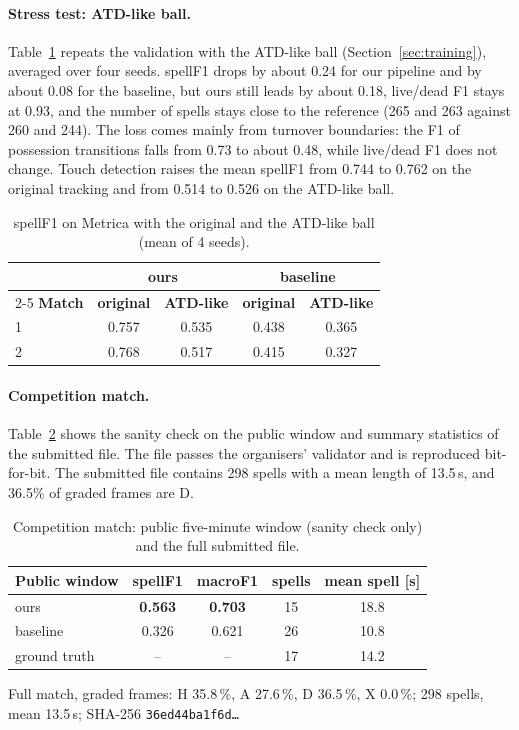 \documentclass[11pt,a4paper]{article}
\newcommand{\code}[1]{\texttt{#1}}
\begin{document}
\paragraph{Stress test: ATD-like ball.}
Table~\ref{tab:stress} repeats the validation with the ATD-like ball (Section~\ref{sec:training}), averaged over four
seeds. spellF1 drops by about 0.24 for our pipeline and by about 0.08 for the baseline, but ours still leads by about
0.18, live/dead F1 stays at 0.93, and the number of spells stays close to the reference (265 and 263 against 260 and
244). The loss comes mainly from turnover boundaries: the F1 of possession transitions falls from 0.73 to about
0.48, while live/dead F1 does not change. Touch detection raises the mean spellF1 from 0.744 to 0.762 on the original tracking and
from 0.514 to 0.526 on the ATD-like ball.

\begin{table}[ht]
\centering
\small
\caption{spellF1 on Metrica with the original and the ATD-like ball (mean of 4 seeds).}
\label{tab:stress}
{\renewcommand{\arraystretch}{1.25}
\begin{tabular}{|l|c|c|c|c|}
\hline
 & \multicolumn{2}{c|}{\textbf{ours}} & \multicolumn{2}{c|}{\textbf{baseline}} \\
\cline{2-5}
\textbf{Match} & \textbf{original} & \textbf{ATD-like} & \textbf{original} & \textbf{ATD-like} \\
\hline
1 & 0.757 & 0.535 & 0.438 & 0.365 \\
\hline
2 & 0.768 & 0.517 & 0.415 & 0.327 \\
\hline
\end{tabular}}
\end{table}

\paragraph{Competition match.}
Table~\ref{tab:match} shows the sanity check on the public window and summary statistics of the submitted file. The
file passes the organisers' validator and is reproduced bit-for-bit. The submitted file contains 298 spells with a mean
length of 13.5\,s, and 36.5\% of graded frames are D.

\begin{table}[ht]
\centering
\small
\caption{Competition match: public five-minute window (sanity check only) and the full submitted file.}
\label{tab:match}
{\renewcommand{\arraystretch}{1.25}
\begin{tabular}{|l|c|c|c|c|}
\hline
\textbf{Public window} & \textbf{spellF1} & \textbf{macroF1} & \textbf{spells} & \textbf{mean spell [s]} \\
\hline
ours            & \textbf{0.563} & \textbf{0.703} & 15 & 18.8 \\
\hline
baseline        & 0.326 & 0.621 & 26 & 10.8 \\
\hline
ground truth    & --    & --    & 17 & 14.2 \\
\hline
\end{tabular}}

\smallskip
Full match, graded frames: H 35.8\,\%, A 27.6\,\%, D 36.5\,\%, X 0.0\,\%; 298 spells, mean 13.5\,s;
SHA-256 \code{36ed44ba1f6d\ldots}
\end{table}
\end{document}

